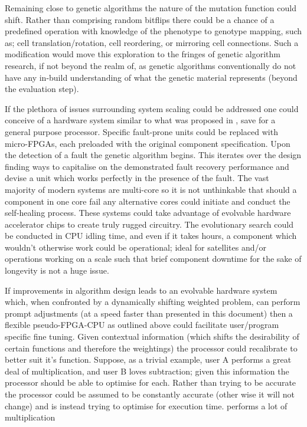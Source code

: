 Remaining close to genetic algorithms the nature of the mutation function
could shift. Rather than comprising random bitflips there could be a chance
of a predefined operation with knowledge of the phenotype to genotype mapping,
such as; cell translation/rotation, cell reordering, or mirroring cell connections.
Such a modification would move this exploration to the fringes of genetic algorithm
research, if not beyond the realm of, as genetic algorithms conventionally do not
have any in-build understanding of what the genetic material represents (beyond the
evaluation step).

If the plethora of issues surrounding system scaling could be addressed
one could conceive of a hardware system similar to what was proposed in
\cite{10.1007/3-540-61093-6_6}, save for a general purpose processor.
Specific fault-prone units could be replaced with micro-FPGAs, each preloaded
with the original component specification. Upon the detection of a fault
the genetic algorithm begins. This iterates over the design finding ways to
capitalise on the demonstrated fault recovery performance and devise a unit
which works perfectly in the presence of the fault. The vast majority of modern systems are multi-core
so it is not unthinkable that should a component in one core fail any alternative
cores could initiate and conduct the self-healing process. These systems
could take advantage of evolvable hardware accelerator chips to create
truly rugged circuitry. The evolutionary search could be conducted in
CPU idling time, and even if it takes hours, a component which wouldn't
otherwise work could be operational; ideal for satellites and/or operations
working on a scale such that brief component downtime for the sake of
longevity is not a huge issue.

If improvements in algorithm design leads to an evolvable hardware system
which, when confronted by a dynamically shifting weighted problem, can
perform prompt adjustments (at a speed faster than presented in this document)
then a flexible pseudo-FPGA-CPU as outlined above could facilitate
user/program specific fine tuning. Given contextual information (which shifts
the desirability of certain functions and therefore the weightings) the
processor could recalibrate to better suit it's function. Suppose,
as a trivial example, user A performs a great deal of multiplication,
and user B loves subtraction; given this information the processor should
be able to optimise for each. Rather than trying to be accurate the processor
could be assumed to be constantly accurate (other wise it will not change)
and is instead trying to optimise for execution time.
performs a lot of multiplication
